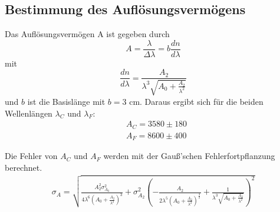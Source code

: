 \subsection{Bestimmung des Auflösungsvermögens}
Das Auflösungsvermögen A ist gegeben durch
\begin{equation*}
  A = \frac{\lambda}{\Delta \lambda} = b\frac{dn}{d\lambda}
\end{equation*}
mit
\begin{equation*}
  \frac{dn}{d\lambda} = \frac{A_2}{\lambda^3\sqrt{A_0 + \frac{A_2}{\lambda^2}}}
\end{equation*}
und $b$ ist die Basislänge mit $b = 3$ cm.
Daraus ergibt sich für die beiden Wellenlängen $\lambda_C$ und $\lambda_F$:
\begin{align*}
  &A_C = 3580 \pm 180 \\
  &A_F = 8600 \pm 400
\end{align*}


Die Fehler von $A_C$ und $A_F$ werden mit der Gauß'schen Fehlerfortpflanzung berechnet.
\begin{align*}
  \sigma_A = \sqrt{\frac{A_2^{2} \sigma_{A_0}^{2}}{4 \lambda^{6} \left(A_0 + \frac{A_2}{\lambda^{2}}\right)^{3}}
  + \sigma_{A_2}^{2} \left(- \frac{A_2}{2 \lambda^{5} \left(A_0 + \frac{A_2}{\lambda^{2}}\right)^{\frac{3}{2}}}
  + \frac{1}{\lambda^{3} \sqrt{A_0 + \frac{A_2}{\lambda^{2}}}}\right)^{2}}
\end{align*}
